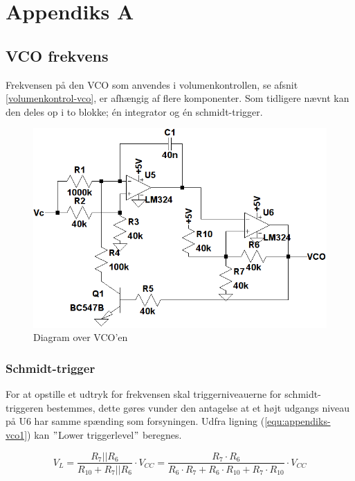 \chapter{Appendiks A}
\label{vco-frekvens}
\section*{VCO frekvens}

Frekvensen på den VCO som anvendes i volumenkontrollen, se afsnit \ref{volumenkontrol-vco}, er afhængig af flere komponenter. Som tidligere nævnt kan den deles op i to blokke; én integrator og én schmidt-trigger. 

\begin{figure}[h]
\centering
\includegraphics[width=\textwidth]{teknisk/volumenkontrol/vco.png}
\caption{Diagram over VCO'en}
\label{fig:appendiks-vco}
\end{figure}

\subsection*{Schmidt-trigger}

For at opstille et udtryk for frekvensen skal triggerniveauerne for schmidt-triggeren bestemmes, dette gøres vunder den antagelse at et højt udgangs niveau på U6 har samme spænding som forsyningen. Udfra ligning (\ref{equ:appendiks-vco1}) kan $"$Lower triggerlevel$"$ beregnes.

\begin{equation}
\label{equ:appendiks-vco1}
V_L = \frac{R_7||R_6}{R_{10} + R_7||R_6} \cdot V_{CC} = \frac{R_7 \cdot R_6}{R_6 \cdot R_7 + R_6 \cdot R_{10} + R_7 \cdot R_{10}} \cdot V_{CC}
\end{equation}

